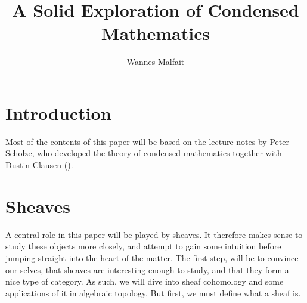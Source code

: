 \documentclass{article}
\title{A Solid Exploration of Condensed Mathematics}
\author{Wannes Malfait}
\date{}
\begin{document}
\maketitle
\newpage
\tableofcontents

\section{Introduction}
Most of the contents of this paper will be based on the lecture
notes by Peter Scholze, who developed the theory of condensed mathematics
together with Dustin Clausen (\cite{Sch2019LecturesCM}).

\section{Sheaves}
A central role in this paper will be played by sheaves.
It therefore makes sense to study these objects more closely,
and attempt to gain some intuition before jumping straight into
the heart of the matter.
The first step, will be to convince our selves, that sheaves
are interesting enough to study, and that they form a nice type
of category. As such, we will dive into sheaf cohomology and some
applications of it in algebraic topology. But first, we must
define what a sheaf is.
\end{document}
